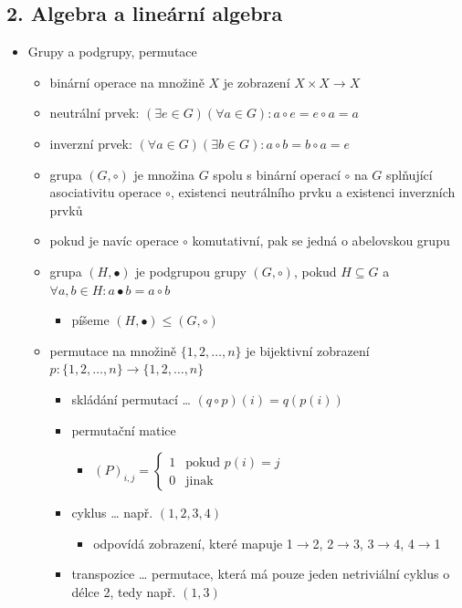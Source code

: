 \subsection{2. Algebra a lineární algebra}
\begin{itemize}
\item Grupy a podgrupy, permutace
\begin{itemize}
\item binární operace na množině $X$ je zobrazení $X \times X \to X$
\item neutrální prvek: $(\exists e \in G)(\forall a \in G): a\circ e = e\circ a = a$
\item inverzní prvek: $(\forall a \in G)(\exists b \in G): a\circ b = b\circ a = e$
\item grupa $(G,\circ)$ je množina $G$ spolu s binární operací $\circ$ na $G$ splňující asociativitu operace $\circ$, existenci neutrálního prvku a existenci inverzních prvků
\item pokud je navíc operace $\circ$ komutativní, pak se jedná o abelovskou grupu
\item grupa $(H,\bullet)$ je podgrupou grupy $(G,\circ)$, pokud $H\subseteq G$ a $\forall a,b\in H:a\bullet b=a\circ b$
\begin{itemize}
\item píšeme $(H,\bullet)\leq (G,\circ)$
\end{itemize}
\item permutace na množině $\lbrace1,2,\dots,n\rbrace$ je bijektivní zobrazení $p:\lbrace1,2,\dots,n\rbrace\rightarrow \lbrace1,2,\dots,n\rbrace$
\begin{itemize}
\item skládání permutací \dots{} $(q\circ p)(i)=q(p(i))$
\item permutační matice
\begin{itemize}
\item $(P)_{i,j} = \begin{cases} 1 &\text{pokud } p(i)=j \\ 0 &\text{jinak}\end{cases}$
\end{itemize}
\item cyklus \dots{} např. $(1,2,3,4)$
\begin{itemize}
\item odpovídá zobrazení, které mapuje 1$\to$2, 2$\to$3, 3$\to$4, 4$\to$1
\end{itemize}
\item transpozice \dots{} permutace, která má pouze jeden netriviální cyklus o délce 2, tedy např. $(1,3)$

\end{itemize}
\end{itemize}
\end{itemize}
